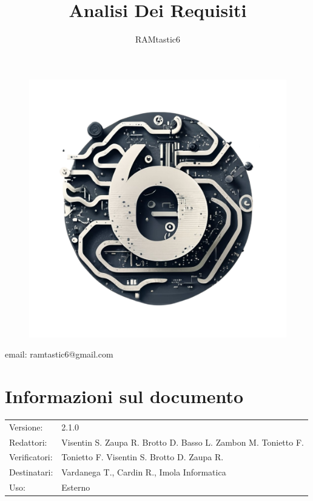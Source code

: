 \documentclass[12pt, oneside]{article}
\author{RAMtastic6}
\begin{document}
\thispagestyle{empty}
\title{Analisi Dei Requisiti}
\maketitle
\begin{figure}[h]
  \centering
  \includegraphics[scale=0.3]{logo.png}
\end{figure}
\begin{center}
    email: ramtastic6@gmail.com
\end{center}

\section*{Informazioni sul documento} 
\begin{tabular}{ll}
Versione: & 2.1.0 \\
Redattori: &  Visentin S.  Zaupa R. Brotto D. Basso L. Zambon M. Tonietto F. \\ 
Verificatori: & Tonietto F. Visentin S. Brotto D. Zaupa R.\\
Destinatari: & Vardanega T., Cardin R., Imola Informatica \\
Uso: & Esterno
\end{tabular}
\newpage
\end{document}
